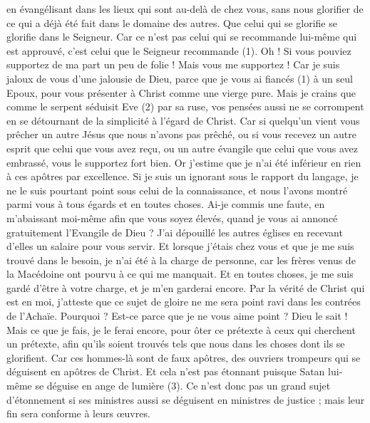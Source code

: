 \begin{multicols}{2}
en évangélisant dans les lieux qui sont au-delà de chez vous, sans nous glorifier de ce qui a déjà été fait dans le domaine des autres.
Que celui qui se glorifie se glorifie dans le Seigneur.
Car ce n'est pas celui qui se recommande lui-même qui est approuvé, c'est celui que le Seigneur recommande (1).
\VerseOne{}Oh ! Si vous pouviez supportez de ma part un peu de folie ! Mais vous me supportez !
Car je suis jaloux de vous d'une jalousie de Dieu, parce que je vous ai fiancés (1) à un seul Epoux, pour vous présenter à Christ comme une vierge pure.
Mais je crains que comme le serpent séduisit Eve (2) par sa ruse, vos pensées aussi ne se corrompent en se détournant de la simplicité à l’égard de Christ.
Car si quelqu'un vient vous prêcher un autre Jésus que nous n'avons pas prêché, ou si vous recevez un autre esprit que celui que vous avez reçu, ou un autre évangile que celui que vous avez embrassé, vous le supportez fort bien.
Or j'estime que je n'ai été inférieur en rien à ces apôtres par excellence.
Si je suis un ignorant sous le rapport du langage, je ne le suis pourtant point sous celui de la connaissance, et nous l’avons montré parmi vous à tous égards et en toutes choses.
Ai-je commis une faute, en m’abaissant moi-même afin que vous soyez élevés, quand je vous ai annoncé gratuitement l’Evangile de Dieu ?
J'ai dépouillé les autres églises en recevant d’elles un salaire pour vous servir. Et lorsque j’étais chez vous et que je me suis trouvé dans le besoin, je n’ai été à la charge de personne,
car les frères venus de la Macédoine ont pourvu à ce qui me manquait. Et en toutes choses, je me suis gardé d’être à votre charge, et je m'en garderai encore.
Par la vérité de Christ qui est en moi, j’atteste que ce sujet de gloire ne me sera point ravi dans les contrées de l'Achaïe.
Pourquoi ? Est-ce parce que je ne vous aime point ? Dieu le sait !
Mais ce que je fais, je le ferai encore, pour ôter ce prétexte à ceux qui cherchent un prétexte, afin qu’ils soient trouvés tels que nous dans les choses dont ils se glorifient.
Car ces hommes-là sont de faux apôtres, des ouvriers trompeurs qui se déguisent en apôtres de Christ.
Et cela n'est pas étonnant puisque Satan lui-même se déguise en ange de lumière (3).
Ce n'est donc pas un grand sujet d'étonnement si ses ministres aussi se déguisent en ministres de justice ; mais leur fin sera conforme à leurs œuvres.

\end{multicols}

